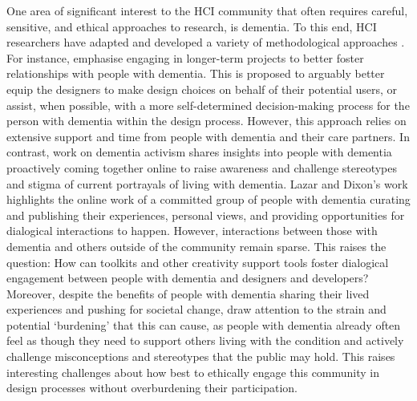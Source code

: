 One area of significant interest to the HCI community that often requires careful, sensitive, and ethical approaches to research, is dementia. To this end, HCI researchers have adapted and developed a variety of methodological approaches \citep{brankaert_intersections_2019,dixon_approach_2020,houben_foregrounding_2019,unbehaun_facilitating_2018,wallace_design-led_2013}. For instance, \cite{hendriks_challenges_2014} emphasise engaging in longer-term projects to better foster relationships with people with dementia. This is proposed to arguably better equip the designers to make design choices on behalf of their potential users, or assist, when possible, with a more self-determined decision-making process for the person with dementia within the design process. However, this approach relies on extensive support and time from people with dementia and their care partners. In contrast, \cite{lazar_safe_2019} work on dementia activism shares insights into people with dementia proactively coming together online to raise awareness and challenge stereotypes and stigma of current portrayals of living with dementia. Lazar and Dixon’s work highlights the online work of a committed group of people with dementia curating and publishing their experiences, personal views, and providing opportunities for dialogical interactions to happen. However, interactions between those with dementia and others outside of the community remain sparse. This raises the question: How can toolkits and other creativity support tools foster dialogical engagement between people with dementia and designers and developers? Moreover, despite the benefits of people with dementia sharing their lived experiences and pushing for societal change, \cite{johnson_older_2019} draw attention to the strain and potential `burdening' that this can cause, as people with dementia already often feel as though they need to support others living with the condition and actively challenge misconceptions and stereotypes that the public may hold. This raises interesting challenges about how best to ethically engage this community in design processes without overburdening their participation.

